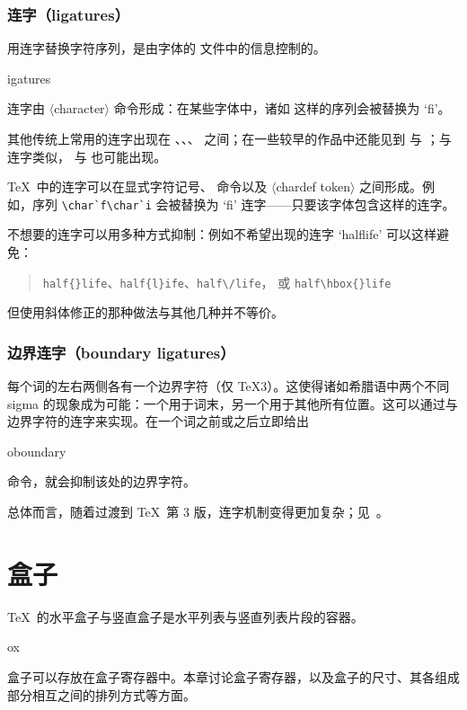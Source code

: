 \documentclass[a4paper]{rapport3}
\makeatletter
\def\gr#1{$\langle$#1$\rangle$}\def\key#1{{\tt#1}}
\newenvironment{disp}{\begin{quotation}}{\end{quotation}}
\def\term#1\par{\index{#1}}
\def\cstoidx#1\par{\index{#1@\cs{#1}}}
\def\csidx#1{\cstoidx #1\par\cs{#1}}
\makeatother
\begin{document}
\subsection{连字（ligatures）}

用连字替换字符序列，是由字体的  文件中的信息控制的。
\term ligatures\par
连字由 \gr{character} 命令形成：在某些字体中，诸如  这样的序列会被替换为 `fi'。

其他传统上常用的连字出现在 、、、 之间；在一些较早的作品中还能见到  与 ；与  连字类似， 与  也可能出现。

\TeX\ 中的连字可以在显式字符记号、 命令以及 \gr{chardef token} 之间形成。例如，序列 \verb-\char`f\char`i- 会被替换为 `fi' 连字——只要该字体包含这样的连字。

不想要的连字可以用多种方式抑制：例如不希望出现的连字 `\hbox{halflife}' 可以这样避免：
\begin{disp} \verb>half{}life>、\verb>half{l}ife>、\verb>half\/life>，
      或 \verb>half\hbox{}life>\end{disp}
但使用斜体修正的那种做法与其他几种并不等价。

\subsection{边界连字（boundary ligatures）}

每个词的左右两侧各有一个边界字符（仅 \TeX3）。这使得诸如希腊语中两个不同 sigma 的现象成为可能：一个用于词末，另一个用于其他所有位置。这可以通过与边界字符的连字来实现。在一个词之前或之后立即给出 \csidx{noboundary} 命令，就会抑制该处的边界字符。

总体而言，随着过渡到 \TeX\ 第 3 版，连字机制变得更加复杂；见~\cite{K:TeX23}。


\endofchapter
\chapter{盒子}\label{boxes}

\TeX\ 的水平盒子与竖直盒子是水平列表与竖直列表片段的容器。
\term box\par
盒子可以存放在盒子寄存器中。本章讨论盒子寄存器，以及盒子的尺寸、其各组成部分相互之间的排列方式等方面。
\end{document}
